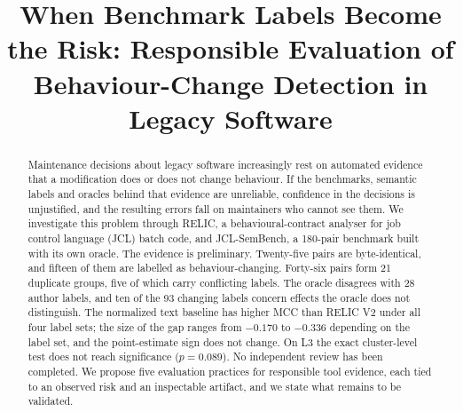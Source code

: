 \documentclass[conference]{IEEEtran}
\begin{document}
\title{When Benchmark Labels Become the Risk: Responsible Evaluation of Behaviour-Change Detection in Legacy Software}

\ifdefined\AnonFlag
\author{
}
\else
\author{
\and
{}\and
{}\and
{}
}
\fi

\maketitle

\begin{abstract}
Maintenance decisions about legacy software increasingly rest on automated evidence that a modification does or does not change behaviour. If the benchmarks, semantic labels and oracles behind that evidence are unreliable, confidence in the decisions is unjustified, and the resulting errors fall on maintainers who cannot see them. We investigate this problem through RELIC, a behavioural-contract analyser for job control language (JCL) batch code, and JCL-SemBench, a 180-pair benchmark built with its own oracle. The evidence is preliminary. Twenty-five pairs are byte-identical, and fifteen of them are labelled as behaviour-changing. Forty-six pairs form 21 duplicate groups, five of which carry conflicting labels. The oracle disagrees with 28 author labels, and ten of the 93 changing labels concern effects the oracle does not distinguish. The normalized text baseline has higher MCC than RELIC V2 under all four label sets; the size of the gap ranges from $-0.170$ to $-0.336$ depending on the label set, and the point-estimate sign does not change. On L3 the exact cluster-level test does not reach significance ($p=0.089$). No independent review has been completed. We propose five evaluation practices for responsible tool evidence, each tied to an observed risk and an inspectable artifact, and we state what remains to be validated.
\end{abstract}
\end{document}
